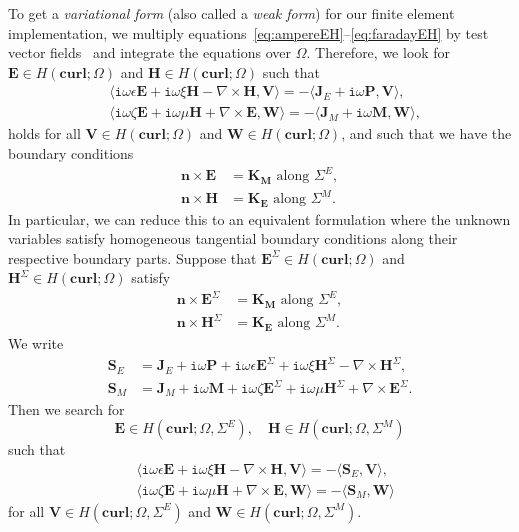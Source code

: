 \documentclass[journal,transmag]{IEEEtran}
\newcommand*\VF[1]{\mathbf{#1}}
\newcommand*\iunit{\mathtt{i}}
\newcommand{\normal}{\mathbf{n}}
\newcommand{\curl}{\VF{curl}}
\begin{document}
To get a \emph{variational form} (also called a \emph{weak form}) for our finite element implementation,
we multiply equations~\eqref{eq:ampereEH}--\eqref{eq:faradayEH} by test vector fields~\cite{LangtangenLogg2017} 
and integrate the equations over $\Omega$.
Therefore, we look for $\VF{E} \in H(\curl;\Omega)$ and $\VF{H} \in H(\curl;\Omega)$ such that 
\begin{align*} 
 &
 \langle \iunit \omega \epsilon \VF{E} + \iunit \omega \xi \VF{H} - \nabla\times\VF{H}, \VF{V} \rangle 
= -\langle \VF{J}_{E} + \iunit \omega \VF{P}, \VF{V} \rangle
 ,
 \\
 &
 \langle \iunit \omega \zeta \VF{E} + \iunit \omega \mu \VF{H} + \nabla\times\VF{E}, \VF{W} \rangle
= -\langle \VF{J}_{M} + \iunit \omega \VF{M}, \VF{W} \rangle
 ,
\end{align*} 
holds for all $\VF{V} \in H(\curl;\Omega)$ and $\VF{W} \in H(\curl;\Omega)$,
and such that we have the boundary conditions 
\begin{align*}
	\normal\times\VF{E}&=\VF{K_M} \textrm{ along } \Sigma^{E},
	\\
	\normal\times\VF{H}&=\VF{K_E} \textrm{ along } \Sigma^{M}.
\end{align*}
In particular, we can reduce this to an equivalent formulation where the unknown variables satisfy homogeneous tangential boundary conditions along their respective boundary parts.
Suppose that $\VF{E}^{\Sigma} \in H(\curl;\Omega)$ and $\VF{H}^{\Sigma} \in H(\curl;\Omega)$ 
satisfy 
\begin{align*}
	\normal\times\VF{E}^{\Sigma} &= \VF{K_M} \textrm{ along } \Sigma^{E}
	,
	\\
	\normal\times\VF{H}^{\Sigma} &= \VF{K_E} \textrm{ along } \Sigma^{M}
	.
\end{align*}
We write 
\begin{align*}
 \VF{S}_{E}
 &=
 \VF{J}_{E} + \iunit \omega \VF{P} 
 +
 \iunit \omega \epsilon \VF{E}^{\Sigma} + \iunit \omega \xi \VF{H}^{\Sigma} - \nabla\times\VF{H}^{\Sigma}
 ,
 \\
 \VF{S}_{M}
 &=
 \VF{J}_{M} + \iunit \omega \VF{M} 
 +
 \iunit \omega \zeta \VF{E}^{\Sigma} + \iunit \omega \mu \VF{H}^{\Sigma} + \nabla\times\VF{E}^{\Sigma}
 .
\end{align*}
Then we search for
$$
\VF{E} \in H(\curl;\Omega,\Sigma^{E}), \quad \VF{H} \in H(\curl;\Omega,\Sigma^{M})
$$
such that 
\begin{align*} 
 &
 \langle \iunit \omega \epsilon \VF{E} + \iunit \omega \xi \VF{H} - \nabla\times\VF{H}, \VF{V} \rangle 
 =
 -\langle \VF{S}_{E}, \VF{V} \rangle
 ,
 \\
 &
 \langle \iunit \omega \zeta \VF{E} + \iunit \omega \mu \VF{H} + \nabla\times\VF{E}, \VF{W} \rangle
 =
 -\langle \VF{S}_{M}, \VF{W} \rangle
\end{align*} 
for all $\VF{V} \in H(\curl;\Omega,\Sigma^{E})$ and $\VF{W} \in H(\curl;\Omega,\Sigma^{M})$.
\\
\end{document}
